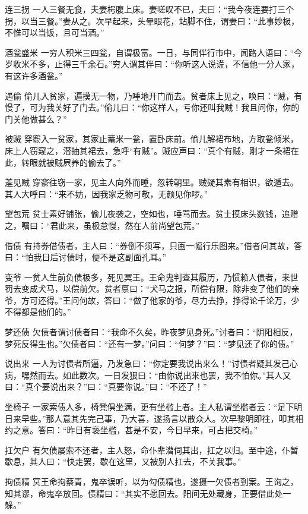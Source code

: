 \documentclass[12pt,UTF8]{ctexbook}
\begin{document}
连三拐
一人三餐无食，夫妻枵腹上床。妻嗟叹不已，夫曰：“我今夜连要打三个拐，以当三餐。”妻从之。次早起来，头晕眼花，站脚不住，谓妻曰：“此事妙极，不惟可以当饭，且可当酒。”

酒瓮盛米
一穷人积米三四瓮，自谓极富。一日，与同伴行市中，闻路人语曰：“今岁收米不多，止得三千余石。”穷人谓其伴曰：“你听这人说谎，不信他一分人家，有这许多酒瓮。”

遇偷
偷儿入贫家，遍摸无一物，乃唾地开门而去。贫者床上见之，唤曰：“贼，有慢了，可为我关好了门去。”偷儿曰：“你这样人，亏你还叫我贼！我且问你，你的门关他做甚么？”

被贼
穿窬入一贫家，其家止蓄米一瓮，置卧床前。偷儿解裙布地，方取瓮倾米，床上人窃窥之，潜抽其裙去，急呼“有贼”。贼应声曰：“真个有贼，刚才一条裙在此，转眼就被贼屄养的偷去了。”

羞见贼
穿窬往窃一家，见主人向外而睡，忽转朝里。贼疑其素有相识，欲遁去。其人大呼曰：“来不妨，因我家乏物可敬，无颜见你啰。”

望包荒
贫士素好铺张，偷儿夜袭之，空如也，唾骂而去。贫士摸床头数钱，追赠之，嘱曰：“君此来，虽极怠慢，然在人前尚望包荒。”

借债
有持券借债者，主人曰：“券倒不须写，只画一幅行乐图来。”借者问其故，答曰：“怕我日后讨债时，便不是这副面孔耳。”

变爷
一贫人生前负债极多，死见冥王。王命鬼判查其履历，乃惯赖人债者，来世罚去变成犬马，以偿前欠。贫者禀曰：“犬马之报，所偿有限，除非变了他们的亲爷，方可还得。”王问何故，答曰：“做了他家的爷，尽力去挣，挣得论千论万，少不得都是他们的。”

梦还债
欠债者谓讨债者曰：“我命不久矣，昨夜梦见身死。”讨者曰：“阴阳相反，梦死反得生也。”欠债者曰：“还有一梦。”问曰：“何梦？”曰：“梦见还了你的债。”

说出来
一人为讨债者所逼，乃发急曰：“你定要我说出来么！”讨债者疑其发己心病，嘿然而去。如此数次。一日发狠曰：“由你说出来也罢，我不怕你。”其人又曰：“真个要说出来？”曰：“真要你说。”曰：“不还了！”

坐椅子
一家索债人多，椅凳俱坐满，更有坐槛上者。主人私谓坐槛者云：“足下明日来早些。”那人意其先完己事，乃大喜，遂扬言以散众人。次早黎明即往，叩其相约之意。答曰：“昨日有亵坐槛，甚是不安，今日早来，可占把交椅。”

扛欠户
有欠债屡索不还者，主人怒，命仆辈潜伺其出，扛之以归。至中途，仆暂歇息，其人曰：“快走罢，歇在这里，又被别人扛去，不关我事。”

拘债精
冥王命拘蔡青，鬼卒误听，以为勾债精也，遂摄一欠债者到案。王询之，知其谬，命鬼卒放回。债精曰：“其实不愿回去。阳间无处藏身，正要借此处一躲。”
\end{document}
